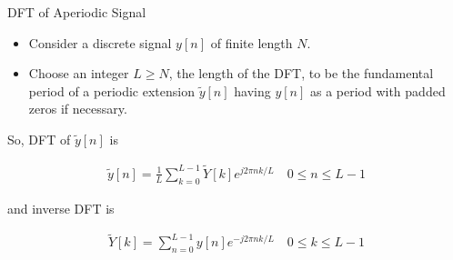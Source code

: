 \documentclass[aspectratio=169,xcolor=dvipsnames,svgnames,x11names,fleqn]{beamer}
\begin{document}
\begin{frame}{DFT of Aperiodic Signal}

\footnotesize



\begin{itemize}
\item Consider a discrete signal $y[n]$ of finite length $N$.
\item Choose an integer $L \geq N$, the length of the DFT, to be the fundamental period of a periodic extension $\tilde{y}[n]$ having $y[n]$ as a period with padded zeros if necessary.
\end{itemize}

So, DFT of $\tilde{y}[n]$ is

 \begin{gradred}
 \begin{align*}
 \tilde{y}[n] = \frac{1}{L} \sum_{k=0}^{L-1}\tilde{Y}[k]e^{j2\pi n k / L} \quad 0 \leq n \leq L - 1 
 \end{align*}
 \end{gradred}
 
 and inverse DFT is
 
 \begin{gradgreen}
  \begin{align*}
 \tilde{Y}[k] = \sum_{n=0}^{L-1} y[n]e^{-j 2\pi n k / L} \quad 0 \leq k \leq L - 1
 \end{align*}
 \end{gradgreen}

\end{frame}
\end{document}
